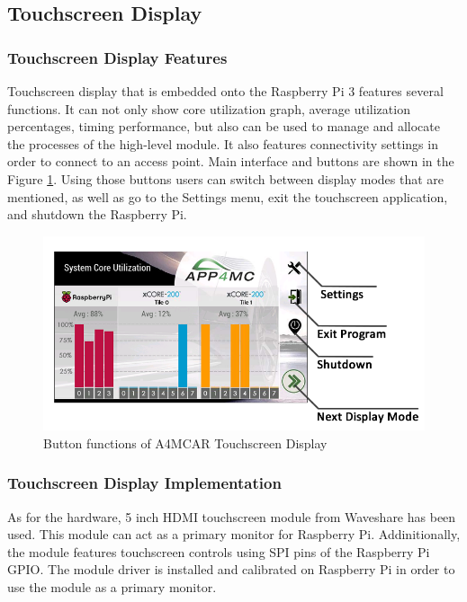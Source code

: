 \subsection{Touchscreen Display}
\subsubsection{Touchscreen Display Features}
Touchscreen display that is embedded onto the Raspberry Pi 3 features several functions. It can not only show core utilization graph, average utilization percentages, timing performance, but also can be used to manage and allocate the processes of the high-level module. It also features connectivity settings in order to connect to an access point. Main interface and buttons are shown in the Figure \ref{fig:displaybuttons}. Using those buttons users can switch between display modes that are mentioned, as well as go to the Settings menu, exit the touchscreen application, and shutdown the Raspberry Pi. 
\begin{figure}[!ht]
	\includegraphics[scale=0.5]{content/images/displaybuttons.png}
	\caption{Button functions of A4MCAR Touchscreen Display}
	\label{fig:displaybuttons}
\end{figure}

\subsubsection{Touchscreen Display Implementation}
As for the hardware, 5 inch HDMI touchscreen module from Waveshare has been used. This module can act as a primary monitor for Raspberry Pi. Addinitionally, the module features touchscreen controls using SPI pins of the Raspberry Pi GPIO. The module driver is installed and calibrated on Raspberry Pi in order to use the module as a primary monitor. 

